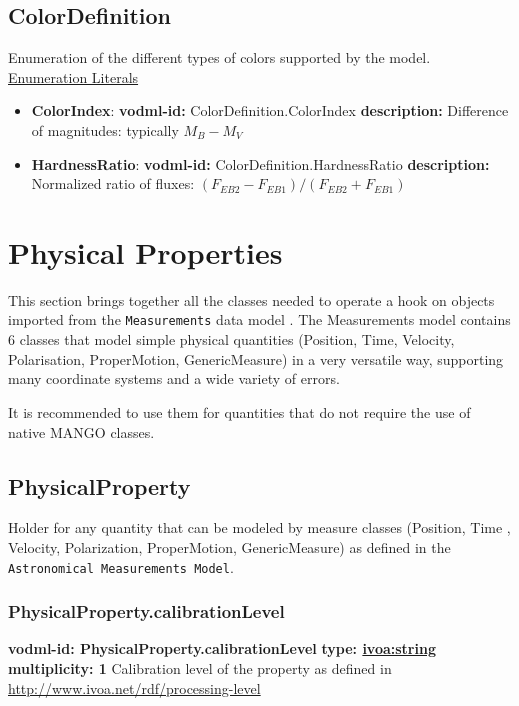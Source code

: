   \subsection{ColorDefinition}
    \label{sect:ColorDefinition}
    Enumeration of the different types of colors supported by the model.
    \newline \newline \noindent \underline{Enumeration Literals}
    \vspace{-\parsep}
    \small
    \begin{itemize}
    \item \textbf{ColorIndex}: \textbf{vodml-id:} ColorDefinition.ColorIndex \newline
    \textbf{description:} Difference of magnitudes: typically $M_B - M_V$
    \item \textbf{HardnessRatio}: \textbf{vodml-id:} ColorDefinition.HardnessRatio \newline
    \textbf{description:} Normalized ratio of fluxes: $(F_{EB2} - F_{EB1}) / (F_{EB2} + F_{EB1})$
    \end{itemize}
    \normalsize

\section{Physical Properties}
This section brings together all the classes needed to operate a hook on 
objects imported from the \texttt{Measurements} data model \citep{2022ivoa.specQ1004R}. 
The Measurements model contains 6 classes that model simple physical quantities 
 (Position, Time, Velocity, Polarisation, ProperMotion, GenericMeasure) in a very versatile way,
supporting many coordinate systems and a wide variety of errors.

It is recommended to use them for quantities that do not require the use of native MANGO classes.


  \subsection{PhysicalProperty}
    \label{sect:PhysicalProperty}
    Holder for any quantity that can be modeled by measure classes (Position, Time , Velocity, Polarization, ProperMotion, GenericMeasure) as defined in the \texttt{Astronomical Measurements Model}.

    \subsubsection{PhysicalProperty.calibrationLevel}
    \textbf{vodml-id: PhysicalProperty.calibrationLevel} \newline
    \textbf{type: \hyperref[sect:ivoa]{ivoa:string}} \newline
    \textbf{multiplicity: 1} \newline
    Calibration level of the property as defined in \url{http://www.ivoa.net/rdf/processing-level}


